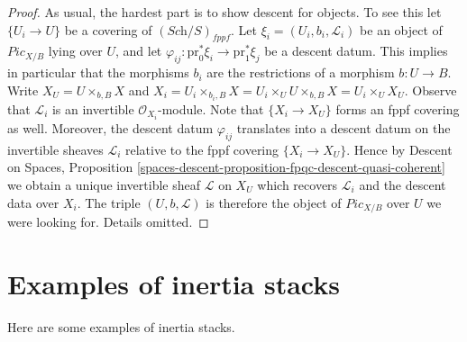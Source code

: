 \begin{proof}
As usual, the hardest part is to show descent for objects.
To see this let $\{U_i \to U\}$ be a covering of $(\textit{Sch}/S)_{fppf}$.
Let $\xi_i = (U_i, b_i, \mathcal{L}_i)$ be an object of
$\textit{Pic}_{X/B}$ lying over $U$, and let
$\varphi_{ij} : \text{pr}_0^*\xi_i \to \text{pr}_1^*\xi_j$
be a descent datum. This implies in particular that the morphisms
$b_i$ are the restrictions of a morphism $b : U \to B$.
Write $X_U = U \times_{b, B} X$ and
$X_i = U_i \times_{b_i, B} X =
U_i \times_U U \times_{b, B} X = U_i \times_U X_U$.
Observe that $\mathcal{L}_i$ is an invertible $\mathcal{O}_{X_i}$-module.
Note that $\{X_i \to X_U\}$ forms an fppf covering as well.
Moreover, the descent datum $\varphi_{ij}$ translates into a
descent datum on the invertible sheaves $\mathcal{L}_i$ relative
to the fppf covering $\{X_i \to X_U\}$.
Hence by
Descent on Spaces,
Proposition \ref{spaces-descent-proposition-fpqc-descent-quasi-coherent}
we obtain a unique invertible sheaf $\mathcal{L}$ on $X_U$
which recovers $\mathcal{L}_i$ and the descent data over $X_i$.
The triple $(U, b, \mathcal{L})$ is therefore the object of
$\textit{Pic}_{X/B}$ over $U$ we were looking for.
Details omitted.
\end{proof}





\section{Examples of inertia stacks}
\label{section-examples-inertia}

\noindent
Here are some examples of inertia stacks.

